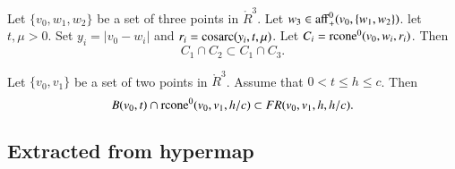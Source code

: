 \begin{tarskidata}
\begin{tarski}
\begin{proved}
\swallowed\end{proved}
\end{tarski}





\begin{tarski}

\begin{lemma}
Let $\{v_0,w_1,w_2\}$ be a set of three points in $\ring{R}^3$.
Let $w_3 \in {\operatorname{aff}}_+^0(v_0,\{w_1,w_2\})$.
let $t,\mu > 0$.  Set $y_i=|v_0-w_i|$
and $r_i={\operatorname{cosarc}}(y_i,t,\mu)$.
Let $C_i={\operatorname{rcone}}^0(v_0,w_i,r_i)$.
Then
  $$
  C_1 \cap C_2 \subset C_1 \cap C_3.
  $$
\end{lemma}

\begin{proved}
\swallowed\end{proved}
\end{tarski}






\begin{tarski}

\begin{lemma}
Let $\{v_0,v_1\}$ be a set of two points in $\ring{R}^3$.
Assume that $0 < t \le h \le c$.  Then
$$
B(v_0,t) \cap {\operatorname{rcone}}^0(v_0,v_1,h/c) \subset
FR(v_0,v_1,h,h/c).
$$
\end{lemma}

\begin{proved}
\swallowed\end{proved}
\end{tarski}








\begin{tarski}
\section{Extracted from hypermap}


\end{tarski}
\end{tarskidata}
